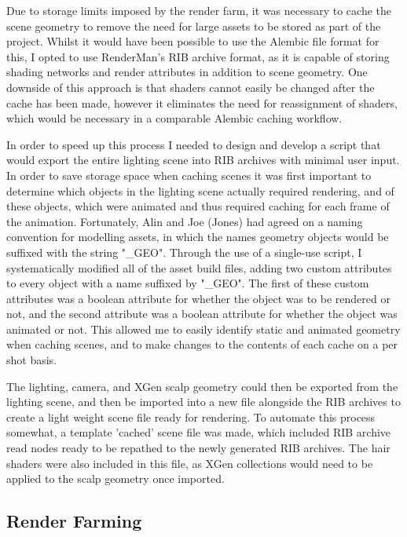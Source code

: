 \documentclass[11pt]{article}
\begin{document}
Due to storage limits imposed by the render farm, it was necessary to cache the scene geometry to remove the need for large assets to be stored as part of the project. Whilst it would have been possible to use the Alembic file format for this, I opted to use RenderMan's RIB archive format, as it is capable of storing shading networks and render attributes in addition to scene geometry. One downside of this approach is that shaders cannot easily be changed after the cache has been made, however it eliminates the need for reassignment of shaders, which would be necessary in a comparable Alembic caching workflow.

In order to speed up this process I needed to design and develop a script that would export the entire lighting scene into RIB archives with minimal user input. In order to save storage space when caching scenes it was first important to determine which objects in the lighting scene actually required rendering, and of these objects, which were animated and thus required caching for each frame of the animation. Fortunately, Alin and Joe (Jones) had agreed on a naming convention for modelling assets, in which the names geometry objects would be suffixed with the string "\_GEO". Through the use of a single-use script, I systematically modified all of the asset build files, adding two custom attributes to every object with a name suffixed by "\_GEO". The first of these custom attributes was a boolean attribute for whether the object was to be rendered or not, and the second attribute was a boolean attribute for whether the object was animated or not. This allowed me to easily identify static and animated geometry when caching scenes, and to make changes to the contents of each cache on a per shot basis.

The lighting, camera, and XGen scalp geometry could then be exported from the lighting scene, and then be imported into a new file alongside the RIB archives to create a light weight scene file ready for rendering. To automate this process somewhat, a template 'cached' scene file was made, which included RIB archive read nodes ready to be repathed to the newly generated RIB archives. The hair shaders were also included in this file, as XGen collections would need to be applied to the scalp geometry once imported.

\subsection{Render Farming}
\end{document}
